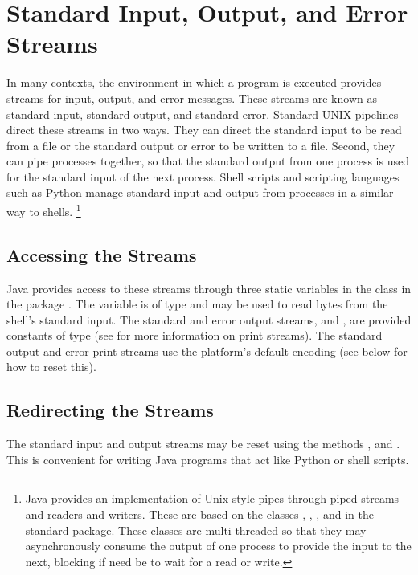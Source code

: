 \section{Standard Input, Output, and Error Streams}\label{section:io-stdin-stdout}

In many contexts, the environment in which a program is executed
provides streams for input, output, and error messages.  These streams
are known as standard input, standard output, and standard error.
Standard UNIX pipelines direct these streams in two ways.  They can
direct the standard input to be read from a file or the standard
output or error to be written to a file.  Second, they can pipe
processes together, so that the standard output from one process is
used for the standard input of the next process.
Shell scripts and scripting languages such as Python manage standard
input and output from processes in a similar way to shells.%
%
\footnote{Java provides an implementation of Unix-style pipes through
  piped streams and readers and writers.  These are based on the
  classes , ,
  , and  in the standard
   package.  These classes are multi-threaded so that
  they may asynchronously consume the output of one process to provide
  the input to the next, blocking if need be to wait for a read or write.}
%

\subsection{Accessing the Streams}

Java provides access to these streams through three static variables
in the class  in the package .  The
variable  is of type 
and may be used to read bytes from the shell's standard input.  The
standard and error output streams,  and
, are provided constants of type 
(see  for more information on print streams).
The standard output and error print streams use the platform's
default encoding (see below for how to reset this).

\subsection{Redirecting the Streams}\label{section:io-reset-system-out}

The standard input and output streams may be reset using the methods
,  and
.  This is convenient for writing Java
programs that act like Python or shell scripts.  

